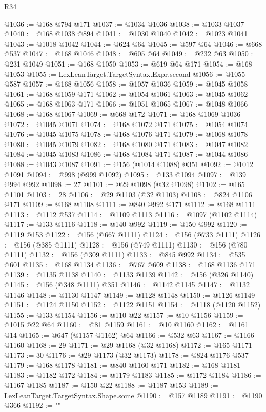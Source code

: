 \begin{lexlean}{R34}
\begin{coremodule}
@1036 := @168 @794 @171
@1037 := @1034 @1036
@1038 := @1033 @1037
@1040 := @168 @1038 @894
@1041 := @1030 @1040
@1042 := @1023 @1041
@1043 := @1018 @1042
@1044 := @624 @64
@1045 := @597 @64
@1046 := @668 @537
@1047 := @168 @1046
@1048 := @605 @64
@1049 := @232 @63
@1050 := @231 @1049
@1051 := @168 @1050
@1053 := @619 @64 @171
@1054 := @168 @1053
@1055 := LexLeanTarget.TargetSyntax.Expr.second
@1056 := @1055 @587
@1057 := @168 @1056
@1058 := @1057 @1036
@1059 := @1045 @1058
@1061 := @168 @1059 @171
@1062 := @1054 @1061
@1063 := @1045 @1062
@1065 := @168 @1063 @171
@1066 := @1051 @1065
@1067 := @1048 @1066
@1068 := @168 @1067
@1069 := @668 @172
@1071 := @168 @1069 @1036
@1072 := @1045 @1071
@1074 := @168 @1072 @171
@1075 := @1054 @1074
@1076 := @1045 @1075
@1078 := @168 @1076 @171
@1079 := @1068 @1078
@1080 := @1045 @1079
@1082 := @168 @1080 @171
@1083 := @1047 @1082
@1084 := @1045 @1083
@1086 := @168 @1084 @171
@1087 := @1044 @1086
@1088 := @1043 @1087
@1091 := @156 (@1014 @1088) @351
@1092 := @1012 @1091
@1094 := @998 (@999 @1092)
@1095 := @133 @1094
@1097 := @139 @994 @992
@1098 := 27
@1101 := @29 @1098 (@32 @1098)
@1102 := @165 @1101
@1103 := 28
@1106 := @29 @1103 (@32 @1103)
@1108 := @824 @1106 @171
@1109 := @168 @1108
@1111 := @840 @992 @171
@1112 := @168 @1111
@1113 := @1112 @537
@1114 := @1109 @1113
@1116 := @1097 (@1102 @1114)
@1117 := @133 @1116
@1118 := @140 @992
@1119 := @150 @992
@1120 := @1119 @153
@1122 := @156 (@667 @1111)
@1124 := @156 (@733 @1111)
@1126 := @156 (@385 @1111)
@1128 := @156 (@749 @1111)
@1130 := @156 (@780 @1111)
@1132 := @156 (@309 @1111)
@1133 := @845 @992
@1134 := @535 @601
@1135 := @168 @1134
@1136 := @767 @609
@1138 := @168 @1136 @171
@1139 := @1135 @1138
@1140 := @1133 @1139
@1142 := @156 (@326 @1140)
@1145 := @156 (@348 @1111) @351
@1146 := @1142 @1145
@1147 := @1132 @1146
@1148 := @1130 @1147
@1149 := @1128 @1148
@1150 := @1126 @1149
@1151 := @1124 @1150
@1152 := @1122 @1151
@1154 := @1118 (@1120 @1152)
@1155 := @133 @1154
@1156 := @110 @22
@1157 := @10 @1156
@1159 := @1015 @22 @64
@1160 := @81 @1159
@1161 := @10 @1160
@1162 := @1161 @14
@1165 := @647 (@1157 @1162) @64
@1166 := @532 @63
@1167 := @1166 @1160
@1168 := 29
@1171 := @29 @1168 (@32 @1168)
@1172 := @165 @1171
@1173 := 30
@1176 := @29 @1173 (@32 @1173)
@1178 := @824 @1176 @537
@1179 := @168 @1178
@1181 := @840 @1160 @171
@1182 := @168 @1181
@1183 := @1182 @172
@1184 := @1179 @1183
@1185 := @1172 @1184
@1186 := @1167 @1185
@1187 := @150 @22
@1188 := @1187 @153
@1189 := LexLeanTarget.TargetSyntax.Shape.some
@1190 := @157 @1189
@1191 := @1190 @366
@1192 := "{"
}
\end{coremodule}
\end{lexlean}
